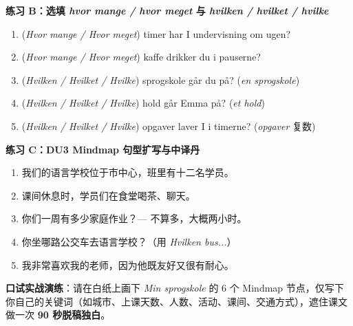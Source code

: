 \textbf{练习 B：选填 \textit{hvor mange / hvor meget} 与 \textit{hvilken / hvilket / hvilke}}
\begin{enumerate}
  \item \underline{\hspace{2.8cm}} (\textit{Hvor mange / Hvor meget}) timer har I undervisning om ugen?
  \item \underline{\hspace{2.8cm}} (\textit{Hvor mange / Hvor meget}) kaffe drikker du i pauserne?
  \item \underline{\hspace{2.8cm}} (\textit{Hvilken / Hvilket / Hvilke}) sprogskole går du på? (\textit{en sprogskole})
  \item \underline{\hspace{2.8cm}} (\textit{Hvilken / Hvilket / Hvilke}) hold går Emma på? (\textit{et hold})
  \item \underline{\hspace{2.8cm}} (\textit{Hvilken / Hvilket / Hvilke}) opgaver laver I i timerne? (\textit{opgaver} 复数)
\end{enumerate}

\textbf{练习 C：DU3 Mindmap 句型扩写与中译丹}
\begin{enumerate}
  \item 我们的语言学校位于市中心，班里有十二名学员。
  \item 课间休息时，学员们在食堂喝茶、聊天。
  \item 你们一周有多少家庭作业？--- 不算多，大概两小时。
  \item 你坐哪路公交车去语言学校？（用 \textit{Hvilken bus...}）
  \item 我非常喜欢我的老师，因为他既友好又很有耐心。
\end{enumerate}


\textbf{口试实战演练}：请在白纸上画下 \textit{Min sprogskole} 的 6 个 Mindmap 节点，仅写下你自己的关键词（如城市、上课天数、人数、活动、课间、交通方式），遮住课文做一次 \textbf{90 秒脱稿独白}。

